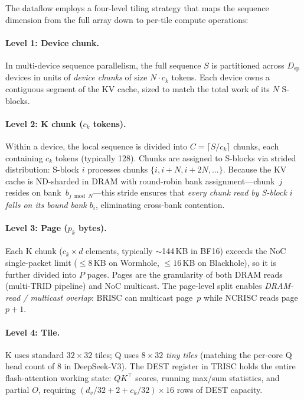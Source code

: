 \documentclass[sigconf, review, anonymous]{acmart}
\newcommand{\SblockName}{S-block}
\newcommand{\SblockNames}{S-blocks}
\begin{document}
The dataflow employs a four-level tiling strategy that maps
the sequence dimension from the full array down to per-tile
compute operations:

\paragraph{Level 1: Device chunk.}
In multi-device sequence parallelism, the full sequence $S$ is
partitioned across $D_{\mathrm{sp}}$ devices in units of
\emph{device chunks} of size $N \cdot c_k$ tokens.  Each device
owns a contiguous segment of the KV cache, sized to match the
total work of its $N$ \SblockNames.

\paragraph{Level 2: K chunk ($c_k$ tokens).}
Within a device, the local sequence is divided into $C = \lceil S / c_k \rceil$
chunks, each containing $c_k$ tokens (typically 128).
Chunks are assigned to \SblockNames{} via strided distribution:
\SblockName{} $i$ processes chunks $\{i, i{+}N, i{+}2N, \ldots\}$.
Because the KV cache is ND-sharded in DRAM with round-robin
bank assignment---chunk~$j$ resides on bank~$b_{j \bmod N}$---this
stride ensures that \emph{every chunk read by \SblockName{} $i$ falls on
its bound bank $b_i$}, eliminating cross-bank contention.

\paragraph{Level 3: Page ($p_k$ bytes).}
Each K chunk ($c_k \times d$ elements, typically ${\sim}$144\,KB in
BF16) exceeds the NoC single-packet limit ($\leq 8$\,KB on Wormhole,
$\leq 16$\,KB on Blackhole), so it is further divided into $P$
pages.  Pages are the granularity of both DRAM reads (multi-TRID
pipeline) and NoC multicast.  The page-level split enables
\emph{DRAM-read / multicast overlap}: BRISC can multicast page~$p$
while NCRISC reads page~$p{+}1$.

\paragraph{Level 4: Tile.}
K uses standard $32{\times}32$ tiles; Q uses $8{\times}32$
\emph{tiny tiles} (matching the per-core Q head count of 8 in
DeepSeek-V3).  The DEST register in TRISC holds the entire
flash-attention working state: $QK^\top$ scores, running max/sum
statistics, and partial $O$, requiring
$(d_v/32 + 2 + c_k/32) \times 16$ rows of DEST capacity.
\end{document}
